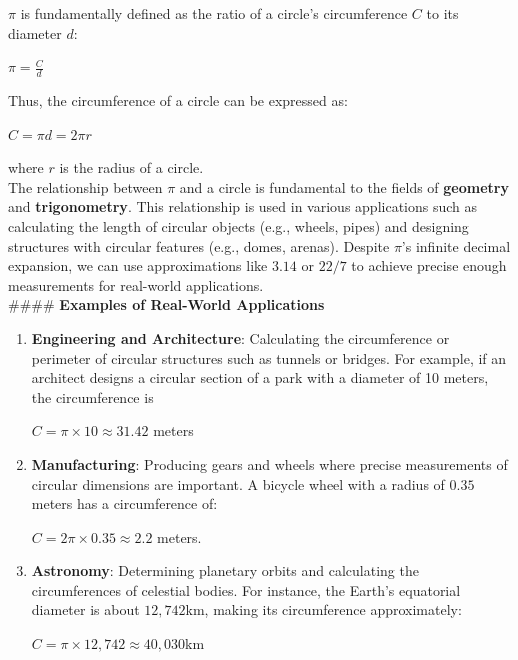 \documentclass[12pt]{article}
\begin{document}
\noindent $\pi$ is fundamentally defined as the ratio of a circle's circumference $C$ to its diameter $d$:
\begin{center}
    $\pi = \frac{C}{d}$
\end{center}

\noindent Thus, the circumference of a circle can be expressed as:
\begin{center}
    $C = \pi d = 2\pi r$
\end{center}
where \(r\) is the radius of a circle.\\

\noindent The relationship between $\pi$ and a circle is fundamental to the fields of \textbf{geometry} and \textbf{trigonometry}. This relationship is used in various applications such as calculating the length of circular objects (e.g., wheels, pipes) and designing structures with circular features (e.g., domes, arenas). Despite $\pi$'s infinite decimal expansion, we can use approximations like $3.14$ or $22/7$ to achieve precise enough measurements for real-world applications.\\

#### \textbf{Examples of Real-World Applications}
\begin{enumerate}
    \item \textbf{Engineering and Architecture}:
    Calculating the circumference or perimeter of circular structures such as tunnels or bridges. For example, if an architect designs a circular section of a park with a diameter of 10 meters, the circumference is
    \begin{center}
        $C = \pi \times 10 \approx 31.42$ meters
    \end{center}
    \item \textbf{Manufacturing}:
    Producing gears and wheels where precise measurements of circular dimensions are important. A bicycle wheel with a radius of $0.35$ meters has a circumference of:
    \begin{center}
        $C = 2\pi \times 0.35 \approx 2.2$ meters.
    \end{center}
    \item \textbf{Astronomy}:
    Determining planetary orbits and calculating the circumferences of celestial bodies. For instance, the Earth's equatorial diameter is about $12,742$km, making its circumference approximately:
    \begin{center}
        $C = \pi \times 12,742 \approx 40,030$km
    \end{center}
\end{enumerate}
\end{document}
